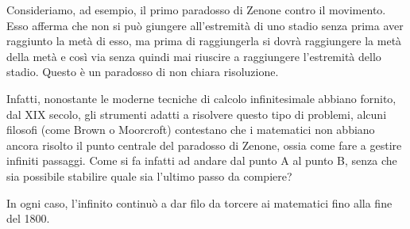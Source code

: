 \documentclass[a4paper,10pt]{article}
\begin{document}
Consideriamo, ad esempio, il primo paradosso di Zenone contro il movimento. Esso afferma che non si può giungere all'estremità di uno stadio senza prima aver raggiunto la metà di esso, ma prima di raggiungerla si dovrà raggiungere la metà della metà e così via senza quindi mai riuscire a raggiungere l'estremità dello stadio. Questo è un paradosso di non chiara risoluzione.

Infatti, nonostante le moderne tecniche di calcolo infinitesimale abbiano fornito, dal XIX secolo, gli strumenti adatti a risolvere questo tipo di problemi, alcuni filosofi (come Brown o Moorcroft) contestano che i matematici non abbiano ancora risolto il punto centrale del paradosso di Zenone, ossia come fare a gestire infiniti passaggi. Come si fa infatti ad andare dal punto A al punto B, senza che sia possibile stabilire quale sia l'ultimo passo da compiere?

In ogni caso, l'infinito continuò a dar filo da torcere ai matematici fino alla fine del 1800.
\end{document}

